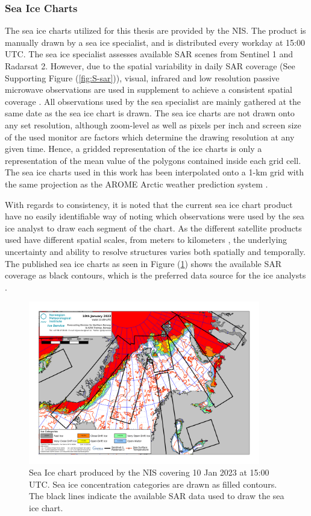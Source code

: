 \documentclass[../main/thesis.tex]{subfiles}
\begin{document}
\subsubsection{Sea Ice Charts}
\label{sec:sea-ice-charts}
The sea ice charts utilized for this thesis are provided by the NIS. The product is manually drawn by a sea ice specialist, and is distributed every workday at 15:00 UTC. The sea ice specialist assesses available SAR scenes from Sentinel 1 and Radarsat 2. However, due to the spatial variability in daily SAR coverage (See Supporting Figure (\ref{fig:S-sar})), visual, infrared and low resolution passive microwave observations are used in supplement to achieve a consistent spatial coverage \citep{Dinessen2020}. All observations used by the sea specialist are mainly gathered at the same date as the sea ice chart is drawn. The sea ice charts are not drawn onto any set resolution, although zoom-level as well as pixels per inch and screen size of the used monitor are factors which determine the drawing resolution at any given time. Hence, a gridded representation of the ice charts is only a representation of the mean value of the polygons contained inside each grid cell. The sea ice charts used in this work has been interpolated onto a 1-km grid with the same projection as the AROME Arctic weather prediction system \citep{Mueller2017}.

With regards to consistency, it is noted that the current sea ice chart product have no easily identifiable way of noting which observations were used by the sea ice analyst to draw each segment of the chart. As the different satellite products used have different spatial scales, from meters to kilometers \citep{Dinessen2020}, the underlying uncertainty and ability to resolve structures varies both spatially and temporally. The published sea ice charts as seen in Figure (\ref{fig:icechart}) shows the available SAR coverage as black contours, which is the preferred data source for the ice analysts \citep{Dinessen2020}. 

\begin{figure}
    \centering
    \includegraphics[width=0.9\textwidth]{general_latest}
    \caption{\label{fig:icechart}Sea Ice chart produced by the NIS covering 10 Jan 2023 at 15:00 UTC. Sea ice concentration categories are drawn as filled contours. The black lines indicate the available SAR data used to draw the sea ice chart.}
\end{figure}
\end{document}
